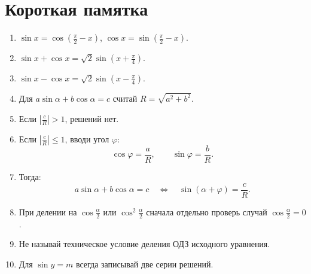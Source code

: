 \documentclass[a4paper,12pt]{article}
\begin{document}
\section*{Короткая памятка}

\begin{enumerate}[label=\textbf{\arabic*.}, leftmargin=8mm]
\item \(\sin x=\cos\left(\frac{\pi}{2}-x\right)\), \(\cos x=\sin\left(\frac{\pi}{2}-x\right)\).
\item \(\sin x+\cos x=\sqrt2\sin\left(x+\frac{\pi}{4}\right)\).
\item \(\sin x-\cos x=\sqrt2\sin\left(x-\frac{\pi}{4}\right)\).
\item Для \(a\sin\alpha+b\cos\alpha=c\) считай \(R=\sqrt{a^2+b^2}\).
\item Если \(\left|\frac{c}{R}\right|>1\), решений нет.
\item Если \(\left|\frac{c}{R}\right|\le1\), вводи угол \(\varphi\):
\[
\cos\varphi=\frac{a}{R},\qquad \sin\varphi=\frac{b}{R}.
\]
\item Тогда:
\[
a\sin\alpha+b\cos\alpha=c
\quad \Longleftrightarrow \quad
\sin(\alpha+\varphi)=\frac{c}{R}.
\]
\item При делении на \(\cos\frac{\alpha}{2}\) или \(\cos^2\frac{\alpha}{2}\) сначала отдельно проверь случай \(\cos\frac{\alpha}{2}=0\).
\item Не называй техническое условие деления ОДЗ исходного уравнения.
\item Для \(\sin y=m\) всегда записывай две серии решений.
\end{enumerate}
\end{document}
